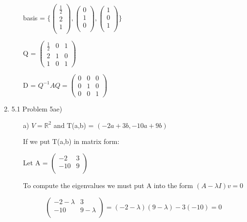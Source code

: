 \documentclass[12pt]{article}
\begin{document}
\begin{enumerate}
\begin{enumerate}[label=(\alph*)]
        basis = $\{\begin{pmatrix}
            \frac{1}{2} \\
            2 \\
            1 \\
        \end{pmatrix}, \begin{pmatrix}
            0\\
            1 \\
            0 \\
        \end{pmatrix}, \begin{pmatrix}
            1\\
            0 \\
            1 \\
        \end{pmatrix} \}$

        Q = $\begin{pmatrix}
            \frac{1}{2} & 0 & 1 \\
            2 & 1 & 0 \\
            1 & 0 & 1
        \end{pmatrix}$

        D = $Q^{-1}AQ = \begin{pmatrix}
            0 & 0 & 0 \\
            0 & 1 & 0 \\
            0 & 0 & 1
        \end{pmatrix}$
            
        \end{enumerate}

    \item 5.1 Problem 5ae)
        \begin{enumerate}[label=(\alph*)]
            \item[a)] 
            $V = \mathbb{R}^2 $ and T(a,b) = $(-2a + 3b, -10a + 9b)$

            If we put T(a,b) in matrix form: 
            
            Let A = $\begin{pmatrix}
                -2 & 3 \\
                -10 & 9 \\
            \end{pmatrix}$

            To compute the eigenvalues we must put A into the form $(A - \lambda I)v = 0$

            \begin{equation}
                \begin{pmatrix}
                -2 - \lambda & 3 \\
                -10 & 9 - \lambda \\
            \end{pmatrix}
            = (-2-\lambda)(9 - \lambda) - 3(-10) = 0
            \end{equation}


\end{enumerate}
\end{enumerate}
\end{document}
